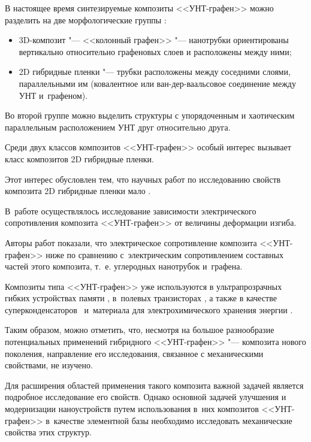 В настоящее время синтезируемые композиты <<УНТ-графен>> можно разделить на две морфологические группы \cite{kol:bib3}: 

\begin{itemize}

\item[1)] 3D-композит "--- <<колонный графен>> "--- нанотрубки ориентированы вертикально относительно графеновых слоев и расположены между ними; 

\item[2)] 2D гибридные пленки "--- трубки расположены между соседними слоями, параллельными им (ковалентное или ван-дер-ваальсовое соединение между УНТ и~графеном). 

\end{itemize}

Во второй группе можно выделить структуры с упорядоченным и хаотическим параллельным расположением УНТ друг относительно друга.



Среди двух классов композитов <<УНТ-графен>> особый интерес вызывает класс композитов 2D гибридные пленки. 

Этот интерес обусловлен тем, что научных работ по исследованию свойств композита 2D гибридные пленки мало \cite{kol:bib4,kol:bib5,kol:bib6,kol:bib7,kol:bib8}. 

В~работе \cite{kol:bib5}  осуществлялось исследование зависимости электрического сопротивления композита <<УНТ-графен>> от величины деформации изгиба.  

Авторы работ \cite{kol:bib4,kol:bib5}  показали, что электрическое сопротивление композита <<УНТ-графен>> ниже по сравнению с~электрическим сопротивлением составных частей этого композита, т.~е. углеродных нанотрубок и~графена. 

Композиты типа <<УНТ-графен>> уже используются в ультрапрозрачных гибких устройствах памяти \cite{kol:bib9}, в~полевых транзисторах \cite{kol:bib4}, а также в качестве суперконденсаторов~\cite{kol:bib10} и~материала для электрохимического хранения энергии \cite{kol:bib11,kol:bib12}. 

Таким образом, можно отметить, что, несмотря на большое разнообразие потенциальных применений гибридного <<УНТ-графен>> "--- композита нового поколения, направление его исследования, связанное с механическими свойствами, не изучено.



Для расширения областей применения такого композита важной задачей является подробное исследование его свойств. Однако основной задачей улучшения и модернизации наноустройств путем использования в~них композитов <<УНТ-графен>> в~качестве элементной базы необходимо исследовать механические свойства этих структур. 

